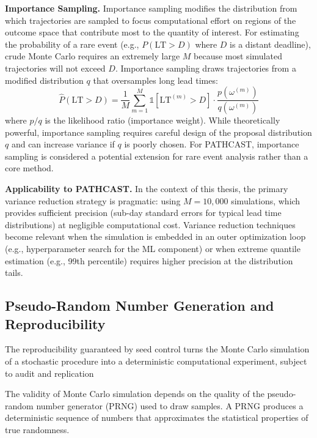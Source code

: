 \textbf{Importance Sampling.} Importance sampling modifies the
distribution from which trajectories are sampled to focus computational
effort on regions of the outcome space that contribute most to the
quantity of interest. For estimating the probability of a rare event
(e.g., $P(\text{LT} > D)$ where $D$ is a distant deadline), crude
Monte Carlo requires an extremely large $M$ because most simulated
trajectories will not exceed $D$. Importance sampling draws trajectories
from a modified distribution $q$ that oversamples long lead times:
\begin{equation}
\label{eq:importance-sampling}
\hat{P}(\text{LT} > D) = \frac{1}{M} \sum_{m=1}^{M}
\mathbb{1}[\text{LT}^{(m)} > D] \cdot
\frac{p(\omega^{(m)})}{q(\omega^{(m)})}
\end{equation}
where $p/q$ is the likelihood ratio (importance weight). While
theoretically powerful, importance sampling requires careful design
of the proposal distribution $q$ and can increase variance if $q$ is
poorly chosen. For PATHCAST, importance sampling is considered a
potential extension for rare event analysis rather than a core method.

\textbf{Applicability to PATHCAST.} In the context of this thesis,
the primary variance reduction strategy is pragmatic: using $M = 10{,}000$
simulations, which provides sufficient precision (sub-day standard errors
for typical lead time distributions) at negligible computational cost.
Variance reduction techniques become relevant when the simulation is
embedded in an outer optimization loop (e.g., hyperparameter search for
the ML component) or when extreme quantile estimation (e.g., 99th
percentile) requires higher precision at the distribution tails.


\subsection{Pseudo-Random Number Generation and Reproducibility}
\label{sec:mc-prng}

The reproducibility guaranteed by seed control turns the Monte Carlo simulation of a stochastic procedure into a deterministic computational experiment, subject to audit and replication

The validity of Monte Carlo simulation depends on the quality of the
pseudo-random number generator (PRNG) used to draw samples. A PRNG
produces a deterministic sequence of numbers that approximates the
statistical properties of true randomness.

